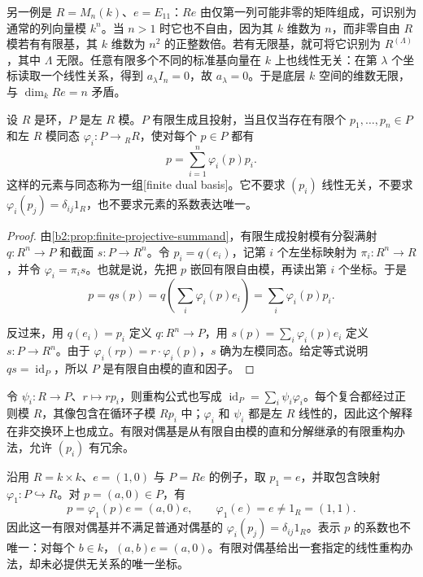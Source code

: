 \ProseParagraphBreak
另一例是 \(R=M_n(k)\)、\(e=E_{11}\)：\(Re\) 由仅第一列可能非零的矩阵组成，可识别为通常的列向量模 \(k^n\)。当 \(n>1\) 时它也不自由，因为其 \(k\) 维数为 \(n\)，而非零自由 \(R\) 模若有有限基，其 \(k\) 维数为 \(n^2\) 的正整数倍。若有无限基，就可将它识别为 \(R^{(\Lambda)}\)，其中 \(\Lambda\) 无限。任意有限多个不同的标准基向量在 \(k\) 上也线性无关：在第 \(\lambda\) 个坐标读取一个线性关系，得到 \(a_\lambda I_n=0\)，故 \(a_\lambda=0\)。于是底层 \(k\) 空间的维数无限，与 \(\dim_k Re=n\) 矛盾。

\begin{proposition}[有限对偶基判据]\label{b2:prop:finite-dual-basis}
	设 \(R\) 是环，\(P\) 是左 \(R\) 模。\(P\) 有限生成且投射，当且仅当存在有限个 \(p_1,\ldots,p_n\in P\) 和左 \(R\) 模同态 \(\varphi_i:P\to {}_RR\)，使对每个 \(p\in P\) 都有
	\[
		p=\sum_{i=1}^n\varphi_i(p)p_i.
	\]
	这样的元素与同态称为一组[finite dual basis]。它不要求 \((p_i)\) 线性无关，不要求 \(\varphi_i(p_j)=\delta_{ij}1_R\)，也不要求元素的系数表达唯一。
\end{proposition}
\begin{proof}
	由\cref{b2:prop:finite-projective-summand}，有限生成投射模有分裂满射 \(q:R^n\to P\) 和截面 \(s:P\to R^n\)。令 \(p_i=q(e_i)\)，记第 \(i\) 个左坐标映射为 \(\pi_i:R^n\to R\)，并令 \(\varphi_i=\pi_i s\)。也就是说，先把 \(p\) 嵌回有限自由模，再读出第 \(i\) 个坐标。于是
	\[
		p=qs(p)=q\left(\sum_i\varphi_i(p)e_i\right) =\sum_i\varphi_i(p)p_i.
	\]

	反过来，用 \(q(e_i)=p_i\) 定义 \(q:R^n\to P\)，用 \(s(p)=\sum_i\varphi_i(p)e_i\) 定义 \(s:P\to R^n\)。由于 \(\varphi_i(rp)=r\cdot\varphi_i(p)\)，\(s\) 确为左模同态。给定等式说明 \(qs=\operatorname{id}_P\)，所以 \(P\) 是有限自由模的直和因子。
\end{proof}

令 \(\psi_i:R\to P\)、\(r\mapsto rp_i\)，则重构公式也写成 \(\operatorname{id}_P=\sum_i\psi_i\varphi_i\)。每个复合都经过正则模 \(R\)，其像包含在循环子模 \(Rp_i\) 中；\(\varphi_i\) 和 \(\psi_i\) 都是左 \(R\) 线性的，因此这个解释在非交换环上也成立。有限对偶基是从有限自由模的直和分解继承的有限重构办法，允许 \((p_i)\) 有冗余。

\ProseParagraphBreak
沿用 \(R=k\times k\)、\(e=(1,0)\) 与 \(P=Re\) 的例子，取 \(p_1=e\)，并取包含映射 \(\varphi_1:P\hookrightarrow R\)。对 \(p=(a,0)\in P\)，有
\[
	p=\varphi_1(p)e=(a,0)e,\qquad \varphi_1(e)=e\ne1_R=(1,1).
\]
因此这一有限对偶基并不满足普通对偶基的 \(\varphi_i(p_j)=\delta_{ij}1_R\)。表示 \(p\) 的系数也不唯一：对每个 \(b\in k\)，\((a,b)e=(a,0)\)。有限对偶基给出一套指定的线性重构办法，却未必提供无关系的唯一坐标。

